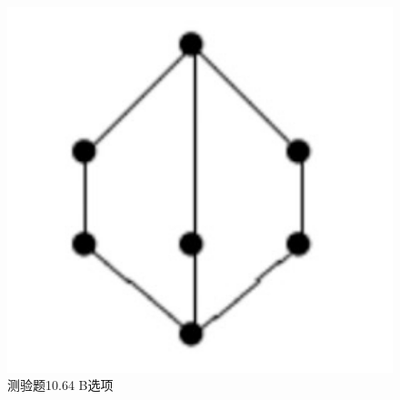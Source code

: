 \documentclass[UTF8, heading=true]{ctexart}
\begin{document}
\begin{figure}[H]
\begin{minipage}[t]{0.2\textwidth}
      \includegraphics[width=1\textwidth]{10.64_2.jpg} %
      \vspace{-0.3cm}
      \caption{测验题10.64 B选项}
\end{minipage}
\end{figure}
\end{document}
